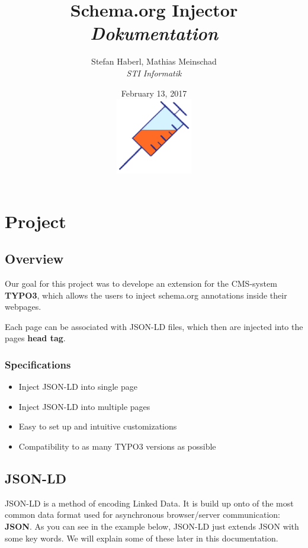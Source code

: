 \documentclass{article}
\begin{document}
\title{\textbf{Schema.org Injector} \\ \emph{Dokumentation} }
\author{Stefan Haberl, Mathias Meinschad \\ \emph{STI Informatik}}
\date{February 13, 2017 \\ \includegraphics[width=0.25\textwidth, height=0.25\textwidth]{icon.png}}


\maketitle
\newpage


\tableofcontents
\newpage


\section{Project}
\subsection{Overview}
Our goal for this project was to develope an extension for the CMS-system \textbf{TYPO3}, which allows the users to inject schema.org annotations inside their webpages.

Each page can be associated with JSON-LD files, which then are injected into the pages \textbf{head tag}.

\subsubsection{Specifications}
	\begin{itemize}
		\item Inject JSON-LD into single page
		\item Inject JSON-LD into multiple pages
		\item Easy to set up and intuitive customizations
		\item Compatibility to as many TYPO3 versions as possible
	\end{itemize}


\subsection{JSON-LD}
JSON-LD is a method of encoding Linked Data. It is build up onto of the most common data format used for asynchronous browser/server communication: \textbf{JSON}. As you can see in the example below, JSON-LD just extends JSON with some key words. We will explain some of these later in this documentation.
\end{document}
